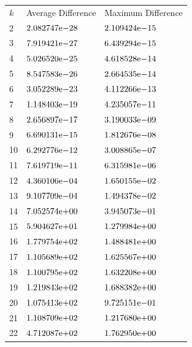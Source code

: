 \begin{table}[!tbh]
 \centering    
\begin{tabular}{ ||p{1.5cm}| p{4cm}| p{4cm}||}
\hline
 $k$  & Average Difference & Maximum Difference \\ \hhline{|=|=|=|}   
    2   & ${2.082747}\mathrm{e}{-28}$   & ${2.109424}\mathrm{e}{-15}$   \\
	3   & ${7.919421}\mathrm{e}{-27}$   & ${6.439294}\mathrm{e}{-15}$   \\
	4   & ${5.026520}\mathrm{e}{-25}$   & ${4.618528}\mathrm{e}{-14}$   \\
	5   & ${8.547583}\mathrm{e}{-26}$   & ${2.664535}\mathrm{e}{-14}$   \\
	6   & ${3.052289}\mathrm{e}{-23}$   & ${4.112266}\mathrm{e}{-13}$   \\
	7   & ${1.148403}\mathrm{e}{-19}$   & ${4.235057}\mathrm{e}{-11}$   \\
	8   & ${2.656897}\mathrm{e}{-17}$   & ${3.190033}\mathrm{e}{-09}$   \\
	9   & ${6.690131}\mathrm{e}{-15}$   & ${1.812676}\mathrm{e}{-08}$   \\
	10  & ${6.292776}\mathrm{e}{-12}$   & ${3.008865}\mathrm{e}{-07}$   \\
	11  & ${7.619719}\mathrm{e}{-11}$   & ${6.315981}\mathrm{e}{-06}$   \\
	12  & ${4.360106}\mathrm{e}{-04}$   & ${1.650155}\mathrm{e}{-02}$   \\
	13  & ${9.107709}\mathrm{e}{-04}$   & ${1.494378}\mathrm{e}{-02}$   \\
	14  & ${7.052574}\mathrm{e}{+00}$   & ${3.945073}\mathrm{e}{-01}$   \\
	15  & ${5.904627}\mathrm{e}{+01}$   & ${1.279984}\mathrm{e}{+00}$   \\
	16  & ${1.779754}\mathrm{e}{+02}$   & ${1.488481}\mathrm{e}{+00}$   \\
	17  & ${1.105689}\mathrm{e}{+02}$   & ${1.625567}\mathrm{e}{+00}$   \\
	18  & ${1.100795}\mathrm{e}{+02}$   & ${1.632208}\mathrm{e}{+00}$   \\
	19  & ${1.219843}\mathrm{e}{+02}$   & ${1.688382}\mathrm{e}{+00}$   \\
	20  & ${1.075413}\mathrm{e}{+02}$   & ${9.725151}\mathrm{e}{-01}$   \\
	21  & ${1.108709}\mathrm{e}{+02}$   & ${1.217680}\mathrm{e}{+00}$   \\
	22  & ${4.712087}\mathrm{e}{+02}$   & ${1.762950}\mathrm{e}{+00}$   \\

\end{tabular}
\end{table}

